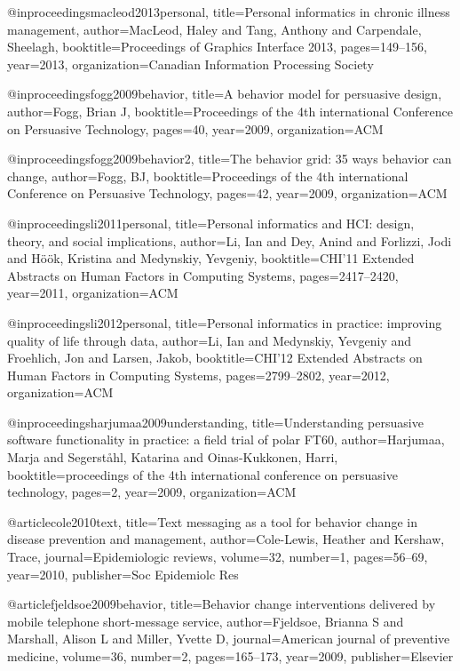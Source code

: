 @inproceedings{macleod2013personal,
  title={Personal informatics in chronic illness management},
  author={MacLeod, Haley and Tang, Anthony and Carpendale, Sheelagh},
  booktitle={Proceedings of Graphics Interface 2013},
  pages={149--156},
  year={2013},
  organization={Canadian Information Processing Society}
}


@inproceedings{fogg2009behavior,
  title={A behavior model for persuasive design},
  author={Fogg, Brian J},
  booktitle={Proceedings of the 4th international Conference on Persuasive Technology},
  pages={40},
  year={2009},
  organization={ACM}
}

@inproceedings{fogg2009behavior2,
  title={The behavior grid: 35 ways behavior can change},
  author={Fogg, BJ},
  booktitle={Proceedings of the 4th international Conference on Persuasive Technology},
  pages={42},
  year={2009},
  organization={ACM}
}

@inproceedings{li2011personal,
  title={Personal informatics and HCI: design, theory, and social implications},
  author={Li, Ian and Dey, Anind and Forlizzi, Jodi and H{\"o}{\"o}k, Kristina and Medynskiy, Yevgeniy},
  booktitle={CHI'11 Extended Abstracts on Human Factors in Computing Systems},
  pages={2417--2420},
  year={2011},
  organization={ACM}
}


@inproceedings{li2012personal,
  title={Personal informatics in practice: improving quality of life through data},
  author={Li, Ian and Medynskiy, Yevgeniy and Froehlich, Jon and Larsen, Jakob},
  booktitle={CHI'12 Extended Abstracts on Human Factors in Computing Systems},
  pages={2799--2802},
  year={2012},
  organization={ACM}
}


@inproceedings{harjumaa2009understanding,
  title={Understanding persuasive software functionality in practice: a field trial of polar FT60},
  author={Harjumaa, Marja and Segerst{\aa}hl, Katarina and Oinas-Kukkonen, Harri},
  booktitle={proceedings of the 4th international conference on persuasive technology},
  pages={2},
  year={2009},
  organization={ACM}
}

@article{cole2010text,
  title={Text messaging as a tool for behavior change in disease prevention and management},
  author={Cole-Lewis, Heather and Kershaw, Trace},
  journal={Epidemiologic reviews},
  volume={32},
  number={1},
  pages={56--69},
  year={2010},
  publisher={Soc Epidemiolc Res}
}

@article{fjeldsoe2009behavior,
  title={Behavior change interventions delivered by mobile telephone short-message service},
  author={Fjeldsoe, Brianna S and Marshall, Alison L and Miller, Yvette D},
  journal={American journal of preventive medicine},
  volume={36},
  number={2},
  pages={165--173},
  year={2009},
  publisher={Elsevier}
}

